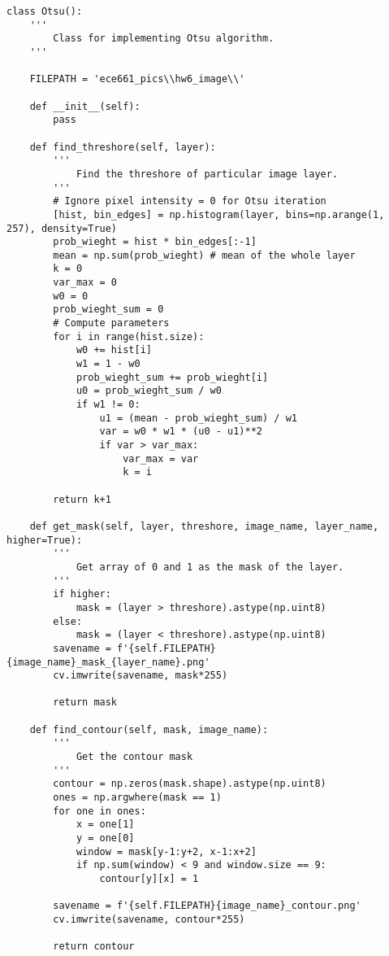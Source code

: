 \documentclass[11pt]{article}
\begin{document}
\begin{lstlisting}
class Otsu():
    '''
        Class for implementing Otsu algorithm.
    '''

    FILEPATH = 'ece661_pics\\hw6_image\\'

    def __init__(self):
        pass

    def find_threshore(self, layer):
        '''
            Find the threshore of particular image layer.
        '''
        # Ignore pixel intensity = 0 for Otsu iteration
        [hist, bin_edges] = np.histogram(layer, bins=np.arange(1, 257), density=True)
        prob_wieght = hist * bin_edges[:-1]
        mean = np.sum(prob_wieght) # mean of the whole layer
        k = 0
        var_max = 0
        w0 = 0
        prob_wieght_sum = 0
        # Compute parameters
        for i in range(hist.size):
            w0 += hist[i]
            w1 = 1 - w0
            prob_wieght_sum += prob_wieght[i]
            u0 = prob_wieght_sum / w0
            if w1 != 0:
                u1 = (mean - prob_wieght_sum) / w1
                var = w0 * w1 * (u0 - u1)**2
                if var > var_max:
                    var_max = var
                    k = i

        return k+1

    def get_mask(self, layer, threshore, image_name, layer_name, higher=True):
        '''
            Get array of 0 and 1 as the mask of the layer.
        '''
        if higher:
            mask = (layer > threshore).astype(np.uint8)
        else:
            mask = (layer < threshore).astype(np.uint8)
        savename = f'{self.FILEPATH}{image_name}_mask_{layer_name}.png'
        cv.imwrite(savename, mask*255)

        return mask

    def find_contour(self, mask, image_name):
        '''
            Get the contour mask
        '''
        contour = np.zeros(mask.shape).astype(np.uint8)
        ones = np.argwhere(mask == 1)
        for one in ones:
            x = one[1]
            y = one[0]
            window = mask[y-1:y+2, x-1:x+2]
            if np.sum(window) < 9 and window.size == 9:
                contour[y][x] = 1
        
        savename = f'{self.FILEPATH}{image_name}_contour.png'
        cv.imwrite(savename, contour*255)

        return contour


\end{lstlisting}
\end{document}

